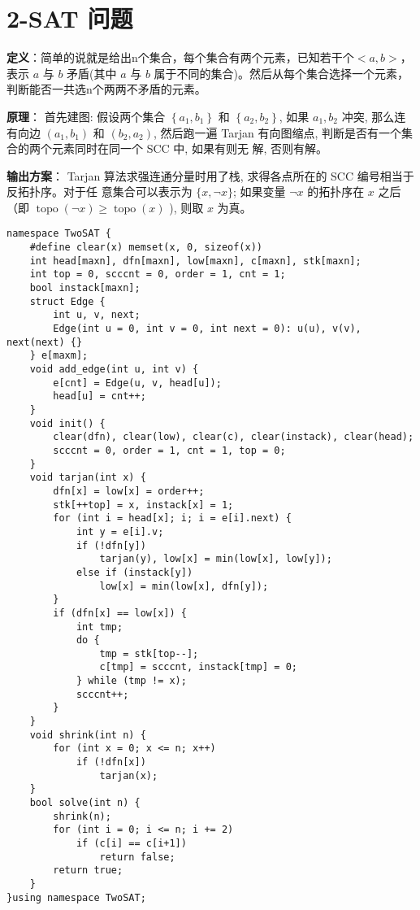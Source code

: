\section{2-SAT 问题}
\begin{tcolorbox}
\par \noindent \textbf{定义}：简单的说就是给出n个集合，每个集合有两个元素，已知若干个$<a,b>$，表示 $a$ 与 $b$ 矛盾(其中 $a$ 与 $b$ 属于不同的集合)。然后从每个集合选择一个元素，判断能否一共选n个两两不矛盾的元素。
\end{tcolorbox}
\par \noindent \textbf{原理}： 首先建图: 假设两个集合 $\left\{a_1, b_1\right\}$ 和 $\left\{a_2, b_2\right\}$, 如果 $a_1, b_2$ 冲突, 那么连有向边 $\left(a_1, b_1\right)$ 和 $\left(b_2, a_2\right)$, 然后跑一遍 Tarjan 有向图缩点, 判断是否有一个集合的两个元素同时在同一个 SCC 中, 如果有则无 解, 否则有解。
~\\
\par \noindent \textbf{输出方案}： Tarjan 算法求强连通分量时用了栈, 求得各点所在的 SCC 编号相当于反拓扑序。对于任 意集合可以表示为 $\{x, \neg x\}$; 如果变量 $\neg x$ 的拓扑序在 $x$ 之后（即 $\operatorname{topo}(\neg x) \geq \operatorname{topo}(x)$ ), 则取 $x$ 为真。
\begin{verbatim}
namespace TwoSAT {
    #define clear(x) memset(x, 0, sizeof(x))
    int head[maxn], dfn[maxn], low[maxn], c[maxn], stk[maxn];
    int top = 0, scccnt = 0, order = 1, cnt = 1;
    bool instack[maxn];
    struct Edge {
        int u, v, next;
        Edge(int u = 0, int v = 0, int next = 0): u(u), v(v), next(next) {}
    } e[maxm];
    void add_edge(int u, int v) {
        e[cnt] = Edge(u, v, head[u]);
        head[u] = cnt++;
    }
    void init() {
        clear(dfn), clear(low), clear(c), clear(instack), clear(head);
        scccnt = 0, order = 1, cnt = 1, top = 0;
    }
    void tarjan(int x) {
        dfn[x] = low[x] = order++;
        stk[++top] = x, instack[x] = 1;
        for (int i = head[x]; i; i = e[i].next) {
            int y = e[i].v;
            if (!dfn[y])
                tarjan(y), low[x] = min(low[x], low[y]);
            else if (instack[y])
                low[x] = min(low[x], dfn[y]);
        }
        if (dfn[x] == low[x]) {
            int tmp;
            do {
                tmp = stk[top--];
                c[tmp] = scccnt, instack[tmp] = 0;
            } while (tmp != x);
            scccnt++;
        }
    }
    void shrink(int n) {
        for (int x = 0; x <= n; x++)
            if (!dfn[x])
                tarjan(x);
    }
    bool solve(int n) {
        shrink(n);
        for (int i = 0; i <= n; i += 2)
            if (c[i] == c[i+1])
                return false;
        return true;
    }
}using namespace TwoSAT;
\end{verbatim}